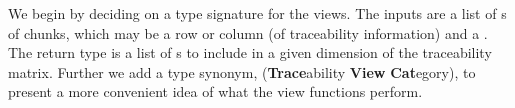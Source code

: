

%


We begin by deciding on a type signature for the views. The inputs are a list of s of chunks, which may be a row or column (of traceability information) and a . The return type is a list of s to include in a given dimension of the traceability matrix. Further we add a type synonym,  (\textbf{Trace}ability \textbf{View} \textbf{Cat}egory), to present a more convenient idea of what the view functions perform.

